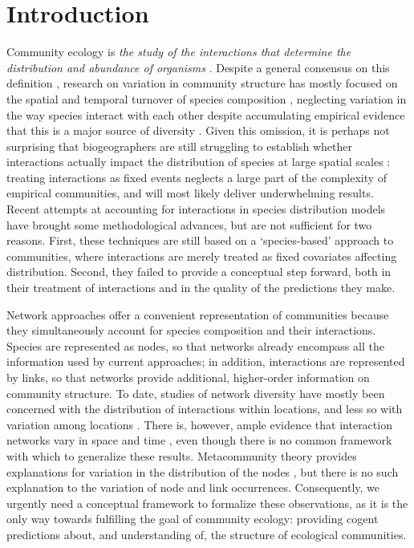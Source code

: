 \documentclass[12pt]{article}
\begin{document}
\newpage

\section*{Introduction}

Community ecology is \textit{the study of the interactions that determine
the distribution and abundance of organisms} \citep{Krebs2001}. Despite a
general consensus on this definition \citep{Scheiner2007a}, research on variation in
community structure has mostly focused on the spatial and temporal turnover
of species composition \citep{Anderson2011}, neglecting variation in the way
species interact with each other despite accumulating empirical evidence that
this is a major source of diversity \citep{Poisot2015a}. Given this omission,
it is perhaps not surprising that biogeographers are still struggling to
establish whether interactions actually impact the distribution of species at
large spatial scales \citep{Wisz2012, Kissling2012}: treating interactions
as fixed events neglects a large part of the complexity of empirical
communities, and will most likely deliver underwhelming results. Recent
attempts at accounting for interactions in species distribution models
\citep{Pollock2014, Pelissier2013} have brought some methodological advances,
but are not sufficient for two reasons. First, these techniques are still
based on a `species-based' approach to communities, where interactions
are merely treated as fixed covariates affecting distribution. Second,
they failed to provide a conceptual step forward, both in their treatment
of interactions and in the quality of the predictions they make.

Network approaches offer a convenient representation of communities because
they simultaneously account for species composition and their interactions.
Species are represented as nodes, so that networks already encompass all the
information used by current approaches; in addition, interactions are
represented by links, so that networks provide additional, higher-order
information on community structure. To date, studies of network diversity have
mostly been concerned with the distribution of interactions within locations,
and less so with variation among locations \citep{Dunne2006, Bascompte2007,
Ings2009, Kefi2012}. There is, however, ample evidence that interaction
networks vary in space and time \citep{Laliberte2010, Poisot2012, Albouy2014,
Poisot2016, Trojelsgaard2015}, even though there is no common framework with
which to generalize these results. Metacommunity theory provides explanations
for variation in the distribution of the nodes \citep{Gravel2011c,
Pillai2011}, but there is no such explanation to the variation of node and
link occurrences. Consequently, we urgently need a conceptual framework to
formalize these observations, as it is the only way towards fulfilling the
goal of community ecology: providing cogent predictions about, and
understanding of, the structure of ecological communities.
\end{document}
